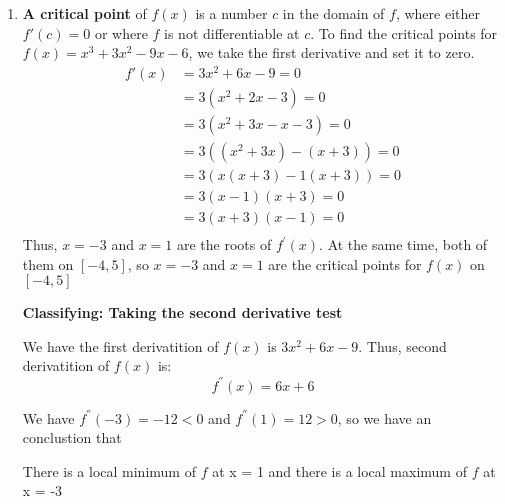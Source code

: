 \documentclass{article}
\begin{document}
	\begin{enumerate}[label=({\alph*})]
        \item \textbf{A critical point} of \(f(x)\) is a number \(c\) in the domain of \(f\), where either \(f'(c) = 0\) or where \(f\) is not differentiable at \(c\). To find the critical points for \(f(x) = x^{3} + 3x^{2} - 9x - 6\), we take the first derivative and set it to zero.
        \begin{align}
            f'(x) &= 3x^2 + 6x - 9 = 0 \\
            &= 3(x^2 + 2x - 3) = 0 \\
            &= 3(x^2 + 3x - x - 3) = 0 \\
            &= 3((x^2 + 3x) - (x + 3)) = 0 \\
            &= 3(x(x + 3) - 1(x + 3)) = 0\\
            &= 3(x - 1)(x + 3) = 0 \\
            &= 3(x + 3)(x - 1) = 0\\
        \end{align}
        Thus, \(x = -3\) and \(x = 1\) are the roots of \(f^{'}(x)\). At the same time, both of them on \([-4, 5]\), so \(x = -3\) and \(x = 1\) are the critical points for \(f(x)\) on \([-4, 5]\)

        \textbf{Classifying: Taking the second derivative test}

        We have the first derivatition of \(f(x)\) is \(3x^{2} + 6x - 9\). Thus, second derivatition of \(f(x)\) is:
        \[f^{''}(x) = 6x + 6\]
        
        We have \(f^{''}(-3) = -12 < 0\) and \(f^{''}(1) = 12 >0\), so we have an conclustion that

        There is a local minimum of \(f\) at x = 1 and there is a local maximum of \(f\) at x = -3


\end{enumerate}
\end{document}
